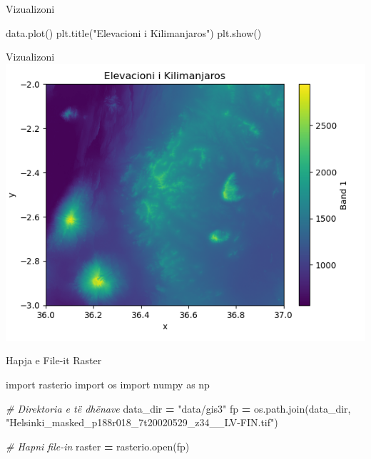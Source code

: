 \documentclass[
  ignorenonframetext,
]{beamer}
\newenvironment{Shaded}{\begin{snugshade}}{\end{snugshade}}
\newcommand{\BuiltInTok}[1]{#1}
\newcommand{\CommentTok}[1]{\textcolor[rgb]{0.56,0.35,0.01}{\textit{#1}}}
\newcommand{\ImportTok}[1]{#1}
\newcommand{\NormalTok}[1]{#1}
\newcommand{\OperatorTok}[1]{\textcolor[rgb]{0.81,0.36,0.00}{\textbf{#1}}}
\newcommand{\StringTok}[1]{\textcolor[rgb]{0.31,0.60,0.02}{#1}}
\begin{document}
\begin{frame}[fragile]{Vizualizoni}
\protect\hypertarget{vizualizoni}{}

\begin{Shaded}
\begin{Highlighting}[]
\NormalTok{data.plot()}
\NormalTok{plt.title(}\StringTok{"Elevacioni i Kilimanjaros"}\NormalTok{)}
\NormalTok{plt.show()}
\end{Highlighting}
\end{Shaded}
\end{frame}

\begin{frame}{Vizualizoni}
\protect\hypertarget{vizualizoni-1}{}
\includegraphics{./Figs/kilima.png}
\end{frame}

\begin{frame}[fragile]{Hapja e File-it Raster}
\protect\hypertarget{hapja-e-file-it-raster}{}

\begin{Shaded}
\begin{Highlighting}[]
\ImportTok{import}\NormalTok{ rasterio}
\ImportTok{import}\NormalTok{ os}
\ImportTok{import}\NormalTok{ numpy }\ImportTok{as}\NormalTok{ np}

\CommentTok{\# Direktoria e të dhënave}
\NormalTok{data\_dir }\OperatorTok{=} \StringTok{"data/gis3"}
\NormalTok{fp }\OperatorTok{=}\NormalTok{ os.path.join(data\_dir, }\StringTok{"Helsinki\_masked\_p188r018\_7t20020529\_z34\_\_LV{-}FIN.tif"}\NormalTok{)}

\CommentTok{\# Hapni file{-}in}
\NormalTok{raster }\OperatorTok{=}\NormalTok{ rasterio.}\BuiltInTok{open}\NormalTok{(fp)}
\end{Highlighting}
\end{Shaded}
\end{frame}
\end{document}
